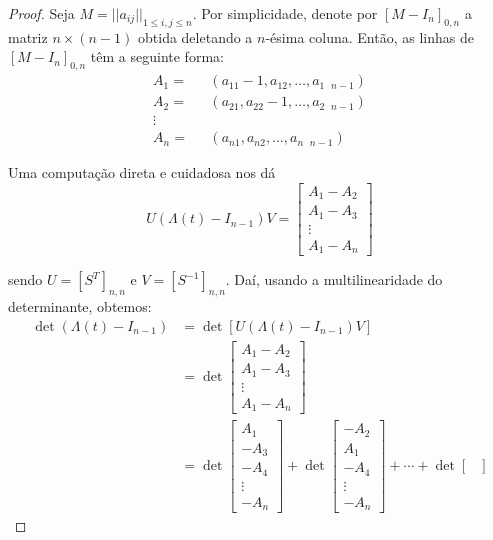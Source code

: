 	\begin{proof}
		Seja $M = ||a_{ij}||_{1\leq i,j\leq n}$. Por simplicidade, denote por $[M - I_n]_{0,n}$ a matriz $n\times(n-1)$ obtida deletando a $n$-ésima coluna. Então, as linhas de $[M - I_n]_{0,n}$ têm a seguinte forma:
		\begin{align*}
		A_1 =& \text{ }(a_{11} - 1, a_{12}, \dots, a_{1\text{ }n-1}) \\
		A_2 =& \text{ }(a_{21}, a_{22} - 1, \dots, a_{2\text{ }n-1}) \\
		\vdots& \\
		A_n =& \text{ }(a_{n1}, a_{n2}, \dots, a_{n\text{ }n-1})
		\end{align*}
		\par\vspace{0.3cm} Uma computação direta e cuidadosa nos dá
		\begin{equation*}
		U(\Lambda(t) - I_{n-1})V = \begin{bmatrix}
		A_1 - A_2 \\
		A_1 - A_3 \\
		\vdots \\
		A_1 - A_n
		\end{bmatrix}
		\end{equation*}
		\par\vspace{0.3cm} sendo $U = [S^T]_{n,n}$ e $V = [S^{-1}]_{n,n}$. Daí, usando a multilinearidade do determinante, obtemos:
		\begin{align*}
		\det(\Lambda(t) - I_{n-1}) 
		&=\det[U(\Lambda(t) - I_{n-1})V] 
		\\
		&= \det\begin{bmatrix}
		A_1 - A_2\\
		A_1 - A_3 \\
		\vdots \\
		A_1 - A_n
		\end{bmatrix}
		\\
		&= \det\begin{bmatrix}
		A_1 \\
		-A_3 \\
		-A_4 \\
		\vdots \\
		-A_n
		\end{bmatrix} + \det\begin{bmatrix}
		-A_2 \\
		A_1 \\
		-A_4 \\
		\vdots\\
		-A_n
		\end{bmatrix} +\cdots + \det\begin{bmatrix}

\end{bmatrix}
\end{align*}
\end{proof}

